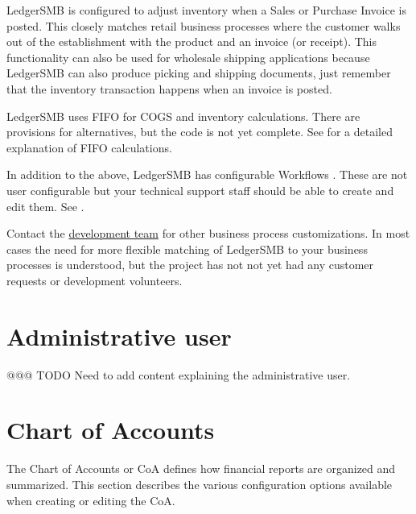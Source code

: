 LedgerSMB is configured to adjust inventory  when a Sales or Purchase Invoice is posted. This closely matches retail business processes where the customer walks out of the establishment with the product and an invoice  (or receipt).  This functionality can also be used for wholesale shipping applications because LedgerSMB can also produce picking  and  shipping documents, just remember that the inventory transaction happens when an invoice is posted.

LedgerSMB uses \gls{FIFO}  for \gls{COGS}  and inventory calculations.  There are provisions for alternatives, but the code is not yet complete. See  for a detailed explanation of  \gls{FIFO} calculations.

In addition to the above, LedgerSMB has configurable Workflows . These are not user configurable but your technical support staff should be able to create and edit them. See .

Contact the \href{https://ledgersmb.org}{development team} for other business process customizations.  In most cases the need for more flexible matching of LedgerSMB to your business processes is understood, but the project has not not yet had any customer requests or development volunteers.

\section{Administrative user}
\label{sec-company-config-admin-user}

@@@ TODO Need to add content explaining the administrative user.

\section{Chart of Accounts}
\label{sec-company-config-coa}


The Chart of Accounts or \gls{CoA} defines how financial reports are organized and summarized.
This section describes the various configuration options available when creating or editing the \gls{CoA}.

